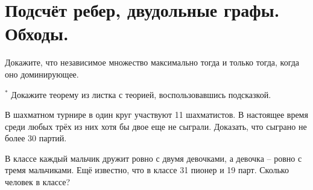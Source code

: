 
\section{Подсчёт ребер, двудольные графы. Обходы.}

\begin{thm}
    Докажите, что независимое множество максимально тогда и только тогда, когда оно доминирующее.
\end{thm}

\begin{thm} $^*$
    Докажите теорему из листка с теорией, воспользовавшись подсказкой.
\end{thm}

\begin{thm}
    В шахматном турнире в один круг участвуют 11 шахматистов. В настоящее время среди любых трёх из них хотя бы двое еще не сыграли. Доказать, что сыграно не более 30 партий.
\end{thm}

\begin{thm}
В классе каждый мальчик дружит ровно с двумя девочками, а девочка -- ровно с тремя мальчиками. Ещё известно, что в классе 31 пионер и 19 парт. Сколько человек в классе?
\end{thm}